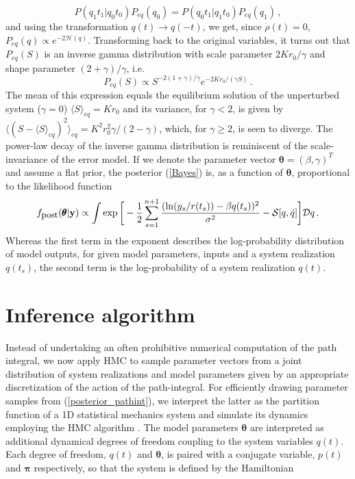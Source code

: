 \documentclass[11pt]{article}
\newcommand{\vc}[1]{{\bf #1 }}
\theoremstyle{definition}
\newcommand{\bt}{\pmb\theta}
\begin{document}
\begin{equation}\label{detailed_balance}
P(q_1 t_1 | q_0 t_0 ) P_{eq}(q_0) = P(q_0 t_1 | q_1 t_0 ) P_{eq}(q_1) \,,
\end{equation}
and using the transformation $q(t) \rightarrow q(-t)$, we get, since $\dot\rho(t)= 0$,
$P_{eq}(q)
  \propto
  e^{-2\mathcal{H}(q)}$.
Transforming back to the original variables, it turns out that $P_{eq}(S)$ is an inverse gamma distribution with scale parameter $2Kr_{0}/\gamma$ and shape parameter $(2+\gamma)/\gamma$, i.e.
\begin{equation}\label{inverse_gamma}
  P_{eq}(S)
  \propto
  S^{-2(1+\gamma)/\gamma}e^{-2Kr_{0}/(\gamma S)}\,.
\end{equation}
The mean of this expression equals the equilibrium solution of the unperturbed system ($\gamma=0$)
$\langle S\rangle_{eq}=Kr_{0}$
and its variance, for $\gamma< 2$, is given by $ \langle (S - \langle S\rangle_{eq})^2\rangle_{eq}
  =
  K^2r_{0}^2
  \gamma/(2-\gamma)$, which, for $\gamma\geq 2$, is seen to diverge.
The power-law decay of the inverse gamma distribution is reminiscent of the scale-invariance of the error model. If we denote the parameter vector $\bt=(\beta,\gamma)^T$ and assume a flat prior, the posterior (\ref{Bayes}) is, as a function of $\bt$, proportional to the likelihood function
\begin{equation}\label{posterior_pathint}
  f_{\mbox{\small post}}(\bt | \vc y)
  \propto
  \int
  \exp\bigg[
    -\frac{1}{2}
    \sum_{s=1}^{n+1}
    \frac
    {(\ln(y_s/r(t_s))-{\beta q(t_s)})^2}
    {\sigma^2} -{{\mathcal S}}[{q},\dot q]
  \bigg]
  {\mathcal Dq}
  \,.
\end{equation}
Whereas the first term in the exponent describes the log-probability distribution of model outputs, for given model parameters, inputs and a system realization $q(t_s)$, the second term is the log-probability of a system realization $q(t)$.



\section{Inference algorithm}

Instead of undertaking an often prohibitive numerical computation of the path integral, we now apply HMC to sample parameter vectors from a joint distribution of system realizations and model parameters given by an appropriate discretization of the action of the path-integral.
For efficiently drawing parameter samples from (\ref{posterior_pathint}), we interpret the latter as the partition function of a 1D statistical mechanics system and simulate its dynamics employing the HMC algorithm \cite{duane_1987}. The model parameters  $\bt$ are interpreted as additional dynamical degrees of freedom coupling to the system variables $q(t)$. Each degree of freedom, $q(t)$ and $\bt$, is paired with a conjugate variable, $p(t)$ and ${\pmb\pi}$ respectively, so that the system is defined by the Hamiltonian
\end{document}
